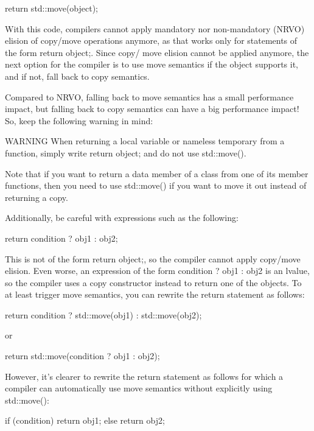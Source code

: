 \begin{cpp}
return std::move(object);
\end{cpp}

With this code, compilers cannot apply mandatory nor non-mandatory (NRVO) elision of copy/move operations anymore, as that works only for statements of the form return object;. Since copy/ move elision cannot be applied anymore, the next option for the compiler is to use move semantics if the object supports it, and if not, fall back to copy semantics.

Compared to NRVO, falling back to move semantics has a small performance impact, but falling back to copy semantics can have a big performance impact! So, keep the following warning in mind:

\begin{myWarning}{WARNING}
When returning a local variable or nameless temporary from a function, simply write return object; and do not use std::move().
\end{myWarning}

Note that if you want to return a data member of a class from one of its member functions, then you need to use std::move() if you want to move it out instead of returning a copy.

Additionally, be careful with expressions such as the following:

\begin{cpp}
return condition ? obj1 : obj2;
\end{cpp}

This is not of the form return object;, so the compiler cannot apply copy/move elision. Even worse, an expression of the form condition ? obj1 : obj2 is an lvalue, so the compiler uses a copy constructor instead to return one of the objects. To at least trigger move semantics, you can rewrite the return statement as follows:

\begin{cpp}
return condition ? std::move(obj1) : std::move(obj2);
\end{cpp}

or

\begin{cpp}
return std::move(condition ? obj1 : obj2);
\end{cpp}

However, it’s clearer to rewrite the return statement as follows for which a compiler can automatically use move semantics without explicitly using std::move():

\begin{cpp}
if (condition) {
    return obj1;
} else {
    return obj2;
}
\end{cpp}

